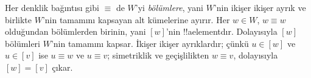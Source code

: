 \documentclass[../../../include/open-logic-section]{subfiles}
\begin{document}
Her denklik bağıntısı gibi $\equiv$ de $W$'yi \emph{bölümlere}, yani
$W$'nin ikişer ikişer ayrık ve birlikte $W$'nin tamamını kapsayan alt
kümelerine ayırır. Her $w\in W$, $w\equiv w$ olduğundan bölümlerden birinin,
yani $[w]$'nin !!a{element}{}dır. Dolayısıyla $[w]$ bölümleri $W$'nin
tamamını kapsar. İkişer ikişer ayrıklardır; çünkü $u\in[w]$ ve $u\in[v]$
ise $u\equiv w$ ve $u\equiv v$; simetriklik ve geçişlilikten $w\equiv v$,
dolayısıyla $[w]=[v]$ çıkar.
\end{document}
